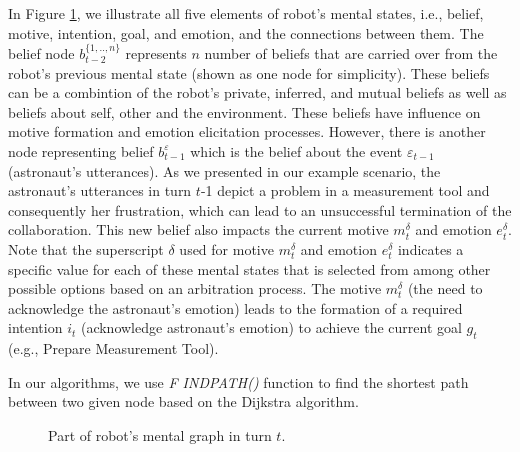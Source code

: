 \documentclass[letterpaper]{article}
\begin{document}
In Figure \ref{fig:mg}, we illustrate all five elements of robot's mental
states, i.e., belief, motive, intention, goal, and emotion, and the connections
between them. The belief node $b^{\{1,..,n\}}_{t-2}$ represents $n$ number of
beliefs that are carried over from the robot's previous mental state (shown as
one node for simplicity). These beliefs can be a combintion of the robot's
private, inferred, and mutual beliefs as well as beliefs about self, other and
the environment. These beliefs have influence on motive formation and emotion
elicitation processes. However, there is another node representing belief
$b^{\varepsilon}_{t-1}$ which is the belief about the event $\varepsilon_{t-1}$
(astronaut's utterances). As we presented in our example scenario, the
astronaut's utterances in turn $t$-1 depict a problem in a measurement tool
and consequently her frustration, which can lead to an unsuccessful termination
of the collaboration. This new belief also impacts the current motive
$m^{\delta}_t$ and emotion $e^{\delta}_t$. Note that the superscript $\delta$
used for motive $m^{\delta}_t$ and emotion $e^{\delta}_t$ indicates a specific
value for each of these mental states that is selected from among other possible
options based on an arbitration process. The motive $m^{\delta}_t$ (the need to
acknowledge the astronaut's emotion) leads to the formation of a required
intention $i_t$ (acknowledge astronaut's emotion) to achieve the current goal
$g_t$ (e.g., Prepare Measurement Tool).

In our algorithms, we use \textit{F{\fontsize{8}{8}\selectfont
IND}P{\fontsize{8}{8}\selectfont ATH}()} function to find the shortest path
between two given node based on the Dijkstra algorithm. 

\begin{figure}
\begin{center}
\caption{{\fontsize{9}{9}\selectfont Part of robot's mental graph in turn $t$.}}
\label{fig:mg}
\end{center}
\vspace*{-6mm}
\end{figure}
\end{document}
